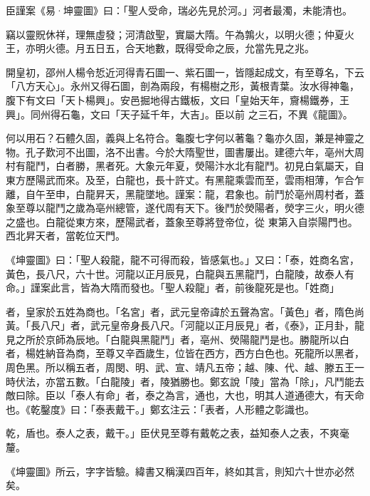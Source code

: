 \begin{pinyinscope}
 臣謹案《易·坤靈圖》曰：「聖人受命，瑞必先見於河。」河者最濁，未能清也。



 竊以靈貺休祥，理無虛發；河清啟聖，實屬大隋。午為鶉火，以明火德；仲夏火王，亦明火德。月五日五，合天地數，既得受命之辰，允當先見之兆。



 開皇初，邵州人楊令悊近河得青石圖一、紫石圖一，皆隱起成文，有至尊名，下云「八方天心」。永州又得石圖，剖為兩段，有楊樹之形，黃根青葉。汝水得神龜，腹下有文曰「天卜楊興」。安邑掘地得古鐵板，文曰「皇始天年，齎楊鐵券，王興」。同州得石龜，文曰「天子延千年，大吉」。臣以前
 之三石，不異《龍圖》。



 何以用石？石體久固，義與上名符合。龜腹七字何以著龜？龜亦久固，兼是神靈之物。孔子歎河不出圖，洛不出書。今於大隋聖世，圖書屢出。建德六年，亳州大周村有龍鬥，白者勝，黑者死。大象元年夏，熒陽汴水北有龍鬥。初見白氣屬天，自東方歷陽武而來。及至，白龍也，長十許丈。有黑龍乘雲而至，雲雨相薄，乍合乍離，自午至申，白龍昇天，黑龍墜地。謹案：龍，君象也。前鬥於亳州周村者，蓋象至尊以龍鬥之歲為亳州總管，遂代周有天下。後鬥於熒陽者，熒字三火，明火德之盛也。白龍從東方來，歷陽武者，蓋象至尊將登帝位，從
 東第入自崇陽門也。西北昇天者，當乾位天門。



 《坤靈圖》曰：「聖人殺龍，龍不可得而殺，皆感氣也。」又曰：「泰，姓商名宮，黃色，長八尺，六十世。河龍以正月辰見，白龍與五黑龍鬥，白龍陵，故泰人有命。」謹案此言，皆為大隋而發也。「聖人殺龍」者，前後龍死是也。「姓商」



 者，皇家於五姓為商也。「名宮」者，武元皇帝諱於五聲為宮。「黃色」者，隋色尚黃。「長八尺」者，武元皇帝身長八尺。「河龍以正月辰見」者，《泰》，正月卦，龍見之所於京師為辰地。「白龍與黑龍鬥」者，亳州、熒陽龍鬥是也。勝龍所以白者，楊姓納音為商，至尊又辛酉歲生，位皆在西方，西方白色也。死龍所以黑者，
 周色黑。所以稱五者，周閔、明、武、宣、靖凡五帝；越、陳、代、越、滕五王一時伏法，亦當五數。「白龍陵」者，陵猶勝也。鄭玄說「陵」當為「除」，凡鬥能去敵曰除。臣以「泰人有命」者，泰之為言，通也，大也，明其人道通德大，有天命也。《乾鑿度》曰：「泰表戴干。」鄭玄注云：「表者，人形體之彰識也。



 乾，盾也。泰人之表，戴干。」臣伏見至尊有戴乾之表，益知泰人之表，不爽毫釐。



 《坤靈圖》所云，字字皆驗。緯書又稱漢四百年，終如其言，則知六十世亦必然矣。




\end{pinyinscope}
